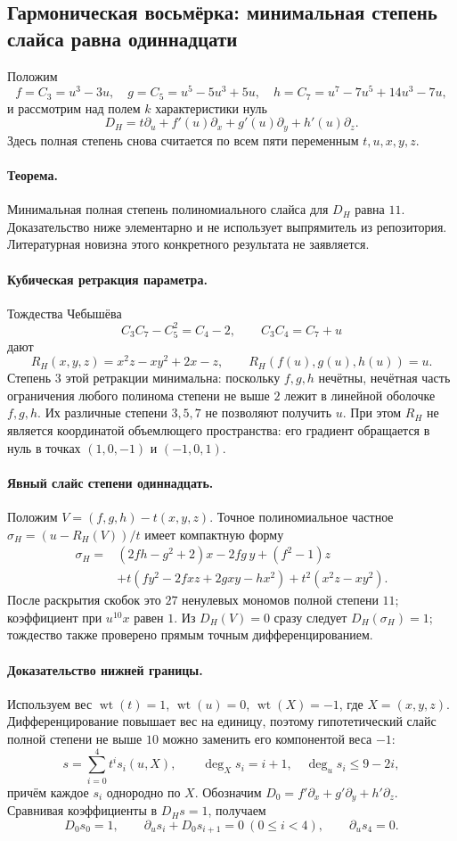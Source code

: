 \subsection{Гармоническая восьмёрка: минимальная степень слайса равна одиннадцати}

Положим
\[
 f=C_3=u^3-3u,\quad g=C_5=u^5-5u^3+5u,\quad
 h=C_7=u^7-7u^5+14u^3-7u,
\]
и рассмотрим над полем $k$ характеристики нуль
\[
 D_H=t\partial_u+f'(u)\partial_x+g'(u)\partial_y+h'(u)\partial_z.
\]
Здесь полная степень снова считается по всем пяти переменным $t,u,x,y,z$.

\paragraph{Теорема.}
Минимальная полная степень полиномиального слайса для $D_H$ равна $11$.
Доказательство ниже элементарно и не использует выпрямитель из репозитория.
Литературная новизна этого конкретного результата не заявляется.

\paragraph{Кубическая ретракция параметра.}
Тождества Чебышёва
\[
 C_3C_7-C_5^2=C_4-2,\qquad C_3C_4=C_7+u
\]
дают
\[
 R_H(x,y,z)=x^2z-xy^2+2x-z,\qquad R_H(f(u),g(u),h(u))=u.
\]
Степень $3$ этой ретракции минимальна: поскольку $f,g,h$ нечётны,
нечётная часть ограничения любого полинома степени не выше $2$
лежит в линейной оболочке $f,g,h$. Их различные степени $3,5,7$
не позволяют получить $u$. При этом $R_H$ не является координатой
объемлющего пространства: его градиент обращается в нуль в точках
$(1,0,-1)$ и $(-1,0,1)$.

\paragraph{Явный слайс степени одиннадцать.}
Положим $V=(f,g,h)-t(x,y,z)$. Точное полиномиальное частное
$\sigma_H=(u-R_H(V))/t$ имеет компактную форму
\begin{align*}
 \sigma_H={}&(2fh-g^2+2)x-2fg\,y+(f^2-1)z\\
 &+t\left(fy^2-2fxz+2gxy-hx^2\right)
 +t^2\left(x^2z-xy^2\right).
\end{align*}
После раскрытия скобок это $27$ ненулевых мономов полной степени $11$;
коэффициент при $u^{10}x$ равен $1$.
Из $D_H(V)=0$ сразу следует $D_H(\sigma_H)=1$;
тождество также проверено прямым точным дифференцированием.

\paragraph{Доказательство нижней границы.}
Используем вес $\operatorname{wt}(t)=1$, $\operatorname{wt}(u)=0$,
$\operatorname{wt}(X)=-1$, где $X=(x,y,z)$.
Дифференцирование повышает вес на единицу, поэтому гипотетический
слайс полной степени не выше $10$ можно заменить его компонентой веса $-1$:
\[
 s=\sum_{i=0}^{4}t^i s_i(u,X),\qquad
 \deg_Xs_i=i+1,\quad \deg_us_i\leq9-2i,
\]
причём каждое $s_i$ однородно по $X$.
Обозначим $D_0=f'\partial_x+g'\partial_y+h'\partial_z$.
Сравнивая коэффициенты в $D_Hs=1$, получаем
\[
 D_0s_0=1,\qquad \partial_us_i+D_0s_{i+1}=0\ (0\leq i<4),
 \qquad \partial_us_4=0.
\]

